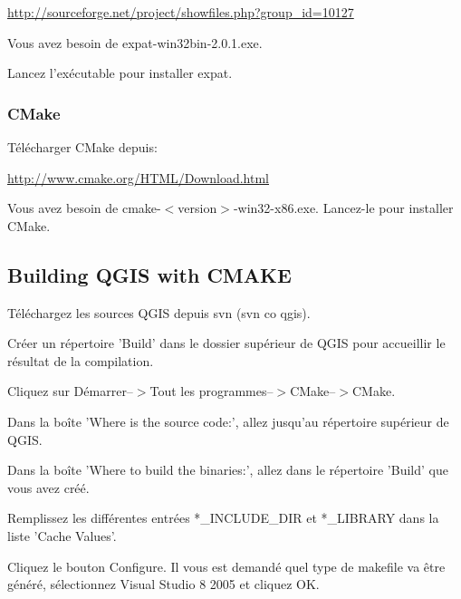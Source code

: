 \url{http://sourceforge.net/project/showfiles.php?group\_id=10127}

Vous avez besoin de expat-win32bin-2.0.1.exe.

Lancez l'exécutable pour installer expat.

\subsubsection{CMake}
Télécharger CMake depuis:

\url{http://www.cmake.org/HTML/Download.html}

Vous avez besoin de cmake-$<$version$>$-win32-x86.exe. Lancez-le pour installer CMake.

\subsection{Building QGIS with CMAKE}
Téléchargez les sources QGIS depuis svn (svn co  qgis).

Créer un répertoire 'Build' dans le dossier supérieur de QGIS pour accueillir le résultat de la compilation.

Cliquez sur Démarrer--$>$Tout les programmes--$>$CMake--$>$CMake. 

% 
% 
% 
% 

Dans la boîte 'Where is the source code:', allez jusqu'au répertoire supérieur de QGIS.

Dans la boîte 'Where to build the binaries:', allez dans le répertoire 'Build' que vous avez créé.

Remplissez les différentes entrées *\_INCLUDE\_DIR et *\_LIBRARY dans la liste 'Cache Values'.

Cliquez le bouton Configure. Il vous est demandé quel type de makefile va être généré, sélectionnez Visual Studio 8 2005 et cliquez OK.

